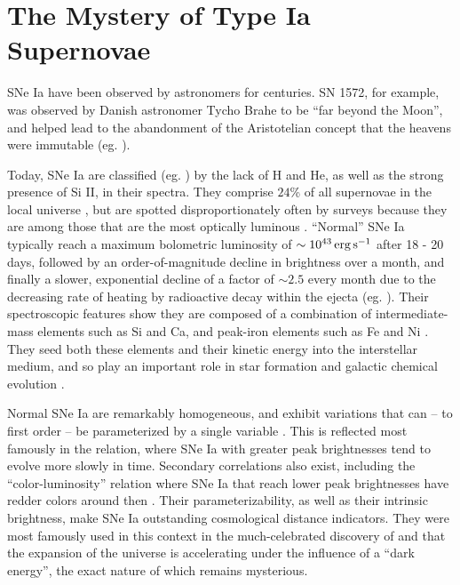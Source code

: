 \section{The Mystery of Type Ia Supernovae}
\label{sec:c1_mysteryofsneia}

SNe Ia have been observed by astronomers for centuries.  SN 1572, for example, was observed by Danish astronomer Tycho Brahe to be ``far beyond the Moon'', and helped lead to the abandonment of the Aristotelian concept that the heavens were immutable (eg. \citealt{clars77}).

Today, SNe Ia are classified (eg. \citealt{fili97, li+11}) by the lack of H and He, as well as the strong presence of Si II, in their spectra.  They comprise $24$\% of all supernovae in the local universe \citep{li+11}, but are spotted disproportionately often by surveys because they are among those that are the most optically luminous \citep{howe11}.  ``Normal'' SNe Ia \citep{bran98, bran+06} typically reach a maximum bolometric luminosity of $\sim10^{43}\,\ergpsec$ after 18 - 20 days, followed by an order-of-magnitude decline in brightness over a month, and finally a slower, exponential decline of a factor of $\sim2.5$ every month due to the decreasing rate of heating by radioactive decay within the ejecta (eg. \citealt{fili97, hill+13}).  Their spectroscopic features show they are composed of a combination of intermediate-mass elements such as Si and Ca, and peak-iron elements such as Fe and Ni \citep{arne96, fili97}.  They seed both these elements and their kinetic energy into the interstellar medium, and so play an important role in star formation and galactic chemical evolution \citep{maozmn14}.

Normal SNe Ia are remarkably homogeneous, and exhibit variations that can -- to first order -- be parameterized by a single variable \citep{hilln00, howe11}.  This is reflected most famously in the \cite{phil93} relation, where SNe Ia with greater peak brightnesses tend to evolve more slowly in time.  Secondary correlations also exist, including the ``color-luminosity'' relation where SNe Ia that reach lower peak brightnesses have redder colors around then \citep{ries+96}.  Their parameterizability, as well as their intrinsic brightness, make SNe Ia outstanding cosmological distance indicators.  They were most famously used in this context in the much-celebrated discovery of \cite{ries+98} and \cite{perl+99} that the expansion of the universe is accelerating under the influence of a ``dark energy'', the exact nature of which remains mysterious.

